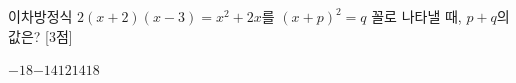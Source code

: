 이차방정식 $2(x+2)(x-3)=x^2+2x$를 $(x+p)^2=q$ 꼴로 나타낼 때, $p+q$의 값은?  \mbox{[3점]}
\begin{choices32}{$-18$}{$-14$}{$12$}{$14$}{$18$}\end{choices32}

